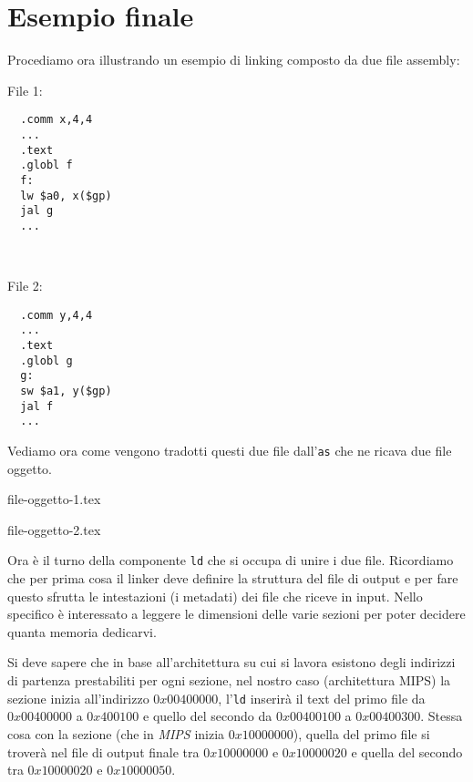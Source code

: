 \documentclass[class=book, crop=false, oneside]{standalone}
\begin{document}
\section{Esempio finale}
Procediamo ora illustrando un esempio di linking composto da due file assembly:
\begin{center}
\begin{minipage}{0.3\textwidth}
\begin{center}File 1:\end{center}
\begin{verbatim}
  .comm x,4,4
  ...
  .text
  .globl f
  f:
  lw $a0, x($gp)
  jal g
  ...
\end{verbatim}
\end{minipage}%
\begin{minipage}{0.2\textwidth}
~
\end{minipage}%
\begin{minipage}{0.3\textwidth}
\begin{center}File 2:\end{center}
\begin{verbatim}
  .comm y,4,4
  ...
  .text
  .globl g
  g:
  sw $a1, y($gp)
  jal f
  ...
\end{verbatim}
\end{minipage}
\end{center}
Vediamo ora come vengono tradotti questi due file dall'\texttt{as} che ne ricava due file oggetto.
\begin{table}[H]
	{file-oggetto-1.tex}
	\caption{File oggetto 1}
\end{table}
\begin{table}[H]
	{file-oggetto-2.tex}
	\caption{File oggetto 2}
\end{table}
Ora è il turno della componente \texttt{ld} che si occupa di unire i due file. Ricordiamo che per prima cosa il linker deve definire la struttura del file di output e per fare questo sfrutta le intestazioni (i metadati) dei file che riceve in input. Nello specifico è interessato a leggere le dimensioni delle varie sezioni per poter decidere quanta memoria dedicarvi.

Si deve sapere che in base all'architettura su cui si lavora esistono degli indirizzi di partenza prestabiliti per ogni sezione, nel nostro caso (architettura MIPS) la sezione  inizia all'indirizzo \(0x00400000\), l'\texttt{ld} inserirà il text del primo file da \(0x00400000\) a \(0x400100\) e quello del secondo da \(0x00400100\) a \(0x00400300\).
Stessa cosa con la sezione  (che in \emph{MIPS} inizia \(0x10000000\)), quella del primo file si troverà nel file di output finale tra \(0x10000000\) e \(0x10000020\) e quella del secondo tra \(0x10000020\) e \(0x10000050\).
\end{document}
